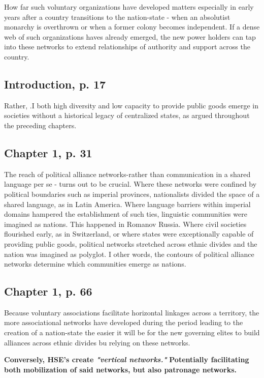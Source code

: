 \documentclass[12pt]{article}
\begin{document}
\bigskip

How far such voluntary organizations have developed matters especially in early
years after a country transitions to the nation-state - when an absolutist
monarchy is overthrown or when a former colony becomes independent. If a dense
web of such organizations haves already emerged, the new power holders can tap
into these networks to extend relationships of authority and support across the
country. 

\subsection{Introduction, p. 17}

Rather, .I both high diversity and low capacity to provide public goods emerge
in societies without a historical legacy of centralized states, as argued
throughout the preceding chapters.

\subsection{Chapter 1, p. 31}

The reach of political alliance networks-rather than communication in a shared
language per se - turns out to be crucial. Where these networks were confined
by political boundaries such as imperial provinces, nationalists divided the
space of a shared language, as in Latin America. Where language barriers within
imperial domains hampered the establishment of such ties, linguistic communities
were imagined as nations. This happened in Romanov Russia. Where civil
societies flourished early, as in Switzerland, or where states were
exceptionally capable of providing public goods, political networks stretched
across ethnic divides and the nation was imagined as polyglot. I other words,
the contours of political alliance networks determine which communities emerge
as nations.

\subsection{Chapter 1, p. 66}

Because voluntary associations facilitate horizontal linkages across a
territory, the more associational networks have developed during the period
leading to the creation of a nation-state the easier it will be for the new
governing elites to build alliances across ethnic divides bu relying on these
networks.

\textbf{Conversely, HSE's create \textit{"vertical networks."}}
\textbf{Potentially facilitating both mobilization of said networks, but also
patronage networks.} 
\end{document}
